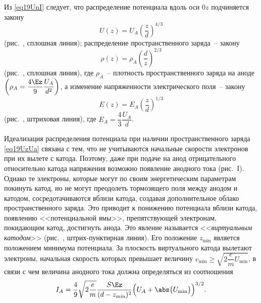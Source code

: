 Из \eqref{eq19UnI} следует, что распределение потенциала вдоль оси \( 0z \)
подчиняется закону
\begin{equation}
  U(z) = U_A \left( \frac{z}{d} \right)^{4 / 3}
  \label{eq19UzUa}
\end{equation}
(рис.~, сплошная линия); распределение пространственного заряда~--
закону
\[
  \rho(z) = \rho_A \left( \frac{d}{z} \right)^{2 / 3}
\]
(рис.~, сплошная линия), где \( \rho_A \)~-- плотность
пространственного заряда на аноде
\(
  \left( \rho_A = \dfrac{4\Ez}{9} \dfrac{U_A}{d^2} \right)
\),
а изменение напряженности электрического поля~-- закону
\[
  E(z) = E_A \left( \frac{z}{d} \right)^{1 / 3}
\]
(рис.~, штриховая линия), где
\(
  E_A = \dfrac{4}{3} \dfrac{U_A}{d}
\).

Идеализация распределения потенциала при наличии пространственного заряда
\eqref{eq19UzUa} связана с тем, что не учитываются начальные скорости электронов
при их вылете с катода. Поэтому, даже при подаче на анод отрицательного
относительно катода напряжения возможно появление анодного тока
(рис.~I). Однако те электроны, которые могут по своим энергетическим
параметрам покинуть катод, но не могут преодолеть тормозящего поля между анодом
и катодом, сосредотачиваются вблизи катода, создавая дополнительное облако
пространственного заряда. Это приводит к понижению потенциала вблизи катода,
появлению <<потенциальной ямы>>, препятствующей электронам, покидающим катод,
достигнуть анода. Это явление называется <<\emph{виртуальным катодом}>>
(рис.~, штрих-пунктирная линия). Его положение \( z_{\min} \) является
положением минимума потенциала. За плоскость виртуального катода вылетают
электроны, начальная скорость которых превышает величину
\(
  v_{\min} \geq \sqrt{2\dfrac{e}{m}U_{\min}}
\),
в связи с чем величина анодного тока должна определяться из соотношения
\[
  I_A = \frac{4}{9} \sqrt{2\frac{e}{m}} \frac{S\Ez}{(d - z_{\min})^2}
  \Big( U_A + \abs{U_{\min}} \Big)^{3 / 2}.
\]
